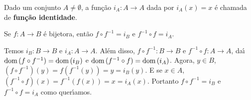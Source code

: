 \begin{definicao}
	Dado um conjunto $A \ne \emptyset$, a fun{\c c}{\~a}o $i_{A}: A \to A$ dada por $i_{A}(x) = x$ {\'e} chamada de \textbf{fun{\c c}{\~a}o identidade}.
\end{definicao}

\begin{proposicao}
	Se $f : A \to B$ {\'e} bijetora, ent{\~a}o $f\circ f^{-1} = i_{B}$ e $f^{-1}\circ f = i_{A}$.
\end{proposicao}
\begin{prova}
	Temos $i_{B} : B \to B$ e $i_{A} : A \to A$. Al{\'e}m disso, $f\circ f^{-1} : B \to B$ e $f^{-1}\circ f : A \to A$, da{\'\i} ${\rm dom\,}(f\circ f^{-1}) = {\rm dom\,}(i_{B})$ e ${\rm dom\,}(f^{-1}\circ f) = {\rm dom\,}(i_{A})$. Agora, $y \in B$, $(f\circ f^{-1})(y) = f(f^{-1}(y)) = y = i_{B}(y)$. E se $x \in A$, $(f^{-1}\circ f)(x) = f^{-1}(f(x)) = x = i_{A}(x)$. Portanto $f\circ f^{-1} = i_{B}$ e $f^{-1}\circ f = i_{A}$ como quer{\'\i}amos.
\end{prova}

